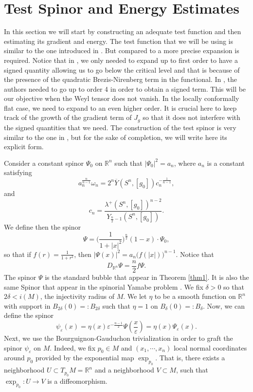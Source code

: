\documentclass[11pt]{article}
\def \R {\mathbb{R}}
\begin{document}
{\section{Test Spinor and Energy Estimates}

\noindent
In this section we will start by constructing an adequate test function and then estimating its gradient and energy. The test function that we will be using is similar to the one introduced in \cite{MMM}. But compared to \cite{MMM} a more precise expansion is required. Notice that in \cite{MMM}, we only needed to expand up to first order to have a signed quantity allowing us to go below the critical level and that is because of the presence of the quadratic Brezis-Nirenberg term in the functional. In \cite{YX1}, the authors needed to go up to order 4 in order to obtain a signed term. This will be our objective when the Weyl tensor does not vanish. In the locally conformally flat case, we need to expand to an even higher order. It is crucial here to keep track of the growth of the gradient term of $J_{g}$ so that it does not interfere with the signed quantities that we need. The construction of the test spinor is very similar to the one in \cite{MMM,YX1}, but for the sake of completion, we will write here its explicit form.



\noindent
Consider a constant spinor $\Psi_{0}$ on $\R^{n}$ such that $|\Psi_{0}|^{2}=a_{n}$, where $a_{n}$ is  a constant satisfying
$$a_{n}^{\frac{n}{n-1}}\omega_{n}=2^{n}\overline{Y}(S^{n},[g_{0}])c_{n}^{-\frac{1}{n-1}},$$
and 
\begin{equation}\label{cn}
c_{n}=\frac{\lambda^{+}(S^{n}, [g_{0}])^{n-2}}{ Y_{\frac{n}{2}-1}(S^{n}, [g_{0}])}.
\end{equation}
We define then the spinor 
\begin{equation}\label{psi}
\Psi=\Big(\frac{1}{1+|x|^{2}}\Big)^{\frac{n}{2}}(1-x)\cdot \Psi_{0},
\end{equation}
so that if $f(r)=\frac{1}{1+r^{2}}$, then $|\Psi(x)|^{2}=a_{n}\big(f(|x|)\big)^{n-1}$. Notice that 
$$D_{\R^{n}}\Psi=\frac{n}{2}f\Psi.$$
The spinor $\Psi$ is the standard bubble that appear in Theorem \ref{thm1}. It is also the same Spinor that appear in the spinorial Yamabe problem \cite{YX1}. We fix $\delta>0$ so that $2\delta<i(M)$, the injectivity radius of $M$. We let $\eta$ to be a smooth function on $\R^{n}$ with support in $B_{2\delta}(0)=:B_{2\delta}$ such that $\eta=1$ on $B_{\delta}(0)=:B_{\delta}$. Now, we can define the spinor 
\begin{equation}\label{psiepsilon}
\psi_{\varepsilon}(x)=\eta(x)\varepsilon^{-\frac{n-1}{2}}\Psi\left(\frac{x}{\varepsilon}\right)=\eta(x) \Psi_{\varepsilon}(x).
\end{equation}
Next, we use the Bourguignon-Gauduchon \cite{Bour} trivialization in order to graft the spinor $\psi_{\varepsilon}$ on $M$. Indeed,  we fix $p_{0}\in M$ and $(x_{1},\cdots,x_{n})$ local normal coordinates around $p_{0}$ provided by the exponential map $\exp_{p_{0}}$. That is, there exists a neighborhood $U\subset T_{p_{0}}M=\R^{n}$ and a neighborhood $V\subset M$, such that $\exp_{p_{0}}:U\to V$ is a diffeomorphism.

}
\end{document}
